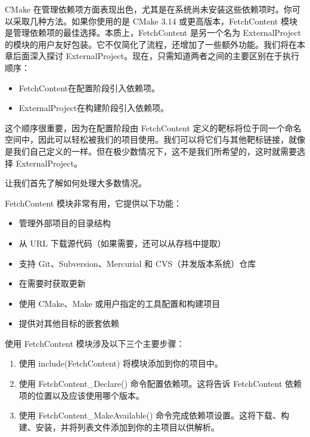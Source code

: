 
CMake 在管理依赖项方面表现出色，尤其是在系统尚未安装这些依赖项时。你可以采取几种方法。如果你使用的是 CMake 3.14 或更高版本，FetchContent 模块是管理依赖项的最佳选择。本质上，FetchContent 是另一个名为 ExternalProject 的模块的用户友好包装。它不仅简化了流程，还增加了一些额外功能。我们将在本章后面深入探讨 ExternalProject。现在，只需知道两者之间的主要区别在于执行顺序：

\begin{itemize}
\item
FetchContent在配置阶段引入依赖项。

\item
ExternalProject在构建阶段引入依赖项。
\end{itemize}

这个顺序很重要，因为在配置阶段由 FetchContent 定义的靶标将位于同一个命名空间中，因此可以轻松被我们的项目使用。我们可以将它们与其他靶标链接，就像是我们自己定义的一样。但在极少数情况下，这不是我们所希望的，这时就需要选择 ExternalProject。

让我们首先了解如何处理大多数情况。


FetchContent 模块非常有用，它提供以下功能：

\begin{itemize}
\item
管理外部项目的目录结构

\item
从 URL 下载源代码（如果需要，还可以从存档中提取）

\item
支持 Git、Subversion、Mercurial 和 CVS（并发版本系统）仓库

\item
在需要时获取更新

\item
使用 CMake、Make 或用户指定的工具配置和构建项目

\item
提供对其他目标的嵌套依赖
\end{itemize}

使用 FetchContent 模块涉及以下三个主要步骤：

\begin{enumerate}
\item
使用 include(FetchContent) 将模块添加到你的项目中。

\item
使用 FetchContent\_Declare() 命令配置依赖项。这将告诉 FetchContent 依赖项的位置以及应该使用哪个版本。

\item
使用 FetchContent\_MakeAvailable() 命令完成依赖项设置。这将下载、构建、安装，并将列表文件添加到你的主项目以供解析。
\end{enumerate}

